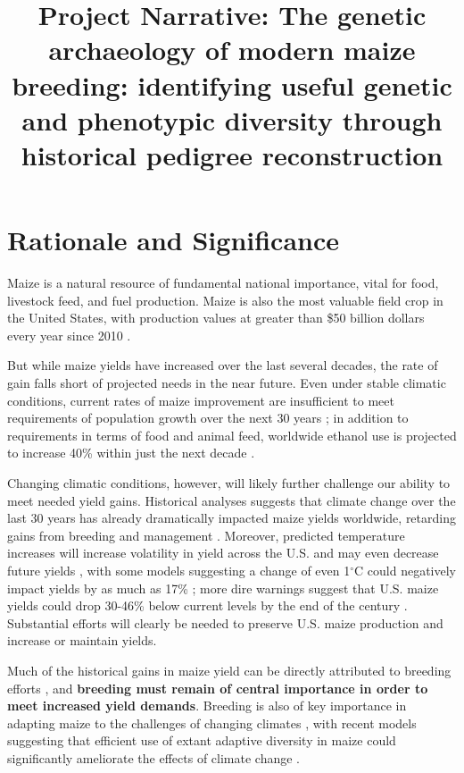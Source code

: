 \documentclass[12pt]{article}
\begin{document}
\title{Project Narrative: The genetic archaeology of modern maize breeding: identifying useful genetic and phenotypic diversity through historical pedigree reconstruction}
\author{}
\date{}
\maketitle

\section*{Rationale and Significance}
\label{rationale}

Maize is a natural resource of fundamental national importance, vital for food, livestock feed, and fuel production.
Maize is also the most valuable field crop in the United States, with production values at greater than \$50 billion dollars every year since 2010 \citep{usdanass}. 

But while maize yields have increased over the last several decades, the rate of gain falls short of projected needs in the near future.
Even under stable climatic conditions, current rates of maize improvement are insufficient to meet requirements of population growth over the next 30 years \citep{ray2013yield}; in  addition to requirements in terms of food and animal feed, worldwide ethanol use is projected to increase 40\% within just the next decade \citep{usdalong}.

Changing climatic conditions, however, will likely further challenge our ability to meet needed yield gains. 
Historical analyses suggests that climate change over the last 30 years has already dramatically impacted maize yields worldwide, retarding gains from breeding and management \citep{Lobell2011}.
Moreover, predicted temperature increases will increase volatility in yield across the U.S. and may even decrease future yields \citep{urban2012projected}, with some models suggesting a change of even 1$^{\circ}$C could negatively impact yields by as much as 17\% \citep{lobell2003climate}; more dire warnings suggest that U.S. maize yields could drop 30-46\% below current levels by the end of the century \citep{schlenker2009nonlinear}.
Substantial efforts will clearly be needed to preserve U.S. maize production and increase or maintain yields.  

Much of the historical gains in maize yield can be directly attributed to breeding efforts \citep{Duvick1992, duvick2005genetic}, and {\bf breeding must remain of central importance in order to meet increased yield demands}.  
Breeding is also of key importance in adapting maize to the challenges of changing climates \citep{Troyer2004a}, with recent models suggesting that efficient use of extant adaptive diversity in maize could significantly ameliorate the effects of climate change \citep{butler2013adaptation}.   
\end{document}
